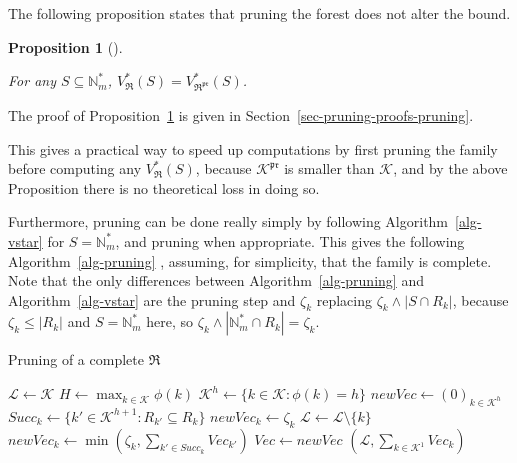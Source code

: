 \documentclass[
  11pt,
  a4paper,
]{article}
\theoremstyle{plain}
\theoremstyle{definition}
\theoremstyle{plain}
\theoremstyle{definition}
\theoremstyle{plain}
\newtheorem{proposition}{Proposition}[section]
\theoremstyle{remark}
\begin{document}
The following proposition states that pruning the forest does not alter
the bound.

\begin{proposition}[]\protect\hypertarget{prp-pruning}{}\label{prp-pruning}

For any \(S\subseteq \mathbb{N}_m^*\),
\(V^*_{\mathfrak{R}}(S)=V^*_{\mathfrak{R}^{\mathfrak{pr}}}(S)\).

\end{proposition}

The proof of Proposition~\ref{prp-pruning} is given in
Section~\ref{sec-pruning-proofs-pruning}.

This gives a practical way to speed up computations by first pruning the
family before computing any \(V^*_{\mathfrak{R}}(S)\), because
\(\mathcal{K}^{\mathfrak{pr}}\) is smaller than \(\mathcal{K}\), and by
the above Proposition there is no theoretical loss in doing so.

Furthermore, pruning can be done really simply by following
 Algorithm~\ref{alg-vstar}  for \(S=\mathbb{N}_m^*\), and pruning when
appropriate. This gives the following  Algorithm~\ref{alg-pruning} ,
assuming, for simplicity, that the family is complete. Note that the
only differences between  Algorithm~\ref{alg-pruning}  and
 Algorithm~\ref{alg-vstar}  are the pruning step and \(\zeta_k\)
replacing \(\zeta_k\wedge|S\cap R_k|\), because \(\zeta_k\leq|R_k|\) and
\(S=\mathbb{N}_m^*\) here, so
\(\zeta_k\wedge|\mathbb{N}_m^*\cap R_k|=\zeta_k\).

\begin{algorithm}[htb!]
\caption{Pruning of a complete $\mathfrak{R}$}
\label{alg-pruning}
\begin{algorithmic}[1]
  \State $\mathcal{L}\gets\mathcal{K}$
  \State $ H \gets \max_{k\in\mathcal{K}} \phi(k)  $ 
    \State $\mathcal{K}^h\gets \{ k\in\mathcal{K} : \phi(k) =h  \}$
    \State $newVec\gets (0)_{k \in  \mathcal{K}^h}$
      \State $Succ_k \gets \{ k' \in  \mathcal{K}^{h+1} : R_{k'}\subseteq R_k\}$
        \State $newVec_k \gets \zeta_k$
      \Else
          \State $\mathcal{L}\gets \mathcal{L}\setminus \{ k \}$ 
        \EndIf
        \State $newVec_k \gets \min\left( \zeta_{k} ,  \sum_{k'\in Succ_k} Vec_{k'}   \right)$
      \EndIf
    \EndFor
    \State $Vec\gets newVec$
  \EndFor
  \State\Return $(\mathcal{L},\sum_{k\in\mathcal{K}^1} Vec_k  )$
\EndProcedure
\end{algorithmic}
\end{algorithm}
\end{document}
